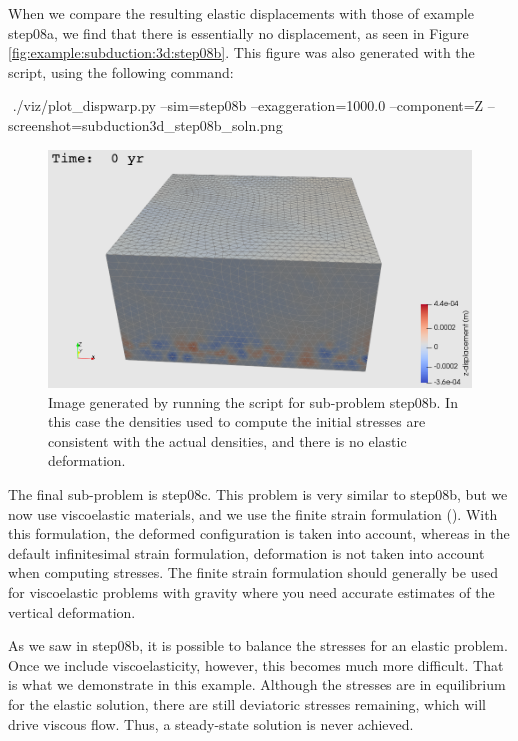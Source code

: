 When we compare the resulting elastic displacements with those of
example step08a, we find that there is essentially no displacement,
as seen in Figure \vref{fig:example:subduction:3d:step08b}. This
figure was also generated with the 
script, using the following command:
\begin{shell}
$$ ./viz/plot_dispwarp.py --sim=step08b --exaggeration=1000.0
--component=Z --screenshot=subduction3d_step08b_soln.png
\end{shell}
\begin{figure}
  \includegraphics[width=4.5in]{examples/figs/subduction3d_step08b_soln}
  \caption{Image generated by running the 
    script for sub-problem step08b. In this case the densities used to
    compute the initial stresses are consistent with the actual
    densities, and there is no elastic deformation.}
  \label{fig:example:subduction:3d:step08b}
\end{figure}

The final sub-problem is step08c. This problem is very similar to
step08b, but we now use viscoelastic materials, and we use the finite
strain formulation (). With this formulation,
the deformed configuration is taken into account, whereas in the
default  infinitesimal strain formulation,
deformation is not taken into account when computing stresses. The
finite strain formulation should generally be used for viscoelastic
problems with gravity where you need accurate estimates of the
vertical deformation.

As we saw in step08b, it is possible to balance the stresses for an
elastic problem. Once we include viscoelasticity, however, this
becomes much more difficult. That is what we demonstrate in this
example. Although the stresses are in equilibrium for the elastic
solution, there are still deviatoric stresses remaining, which will
drive viscous flow. Thus, a steady-state solution is never achieved.

